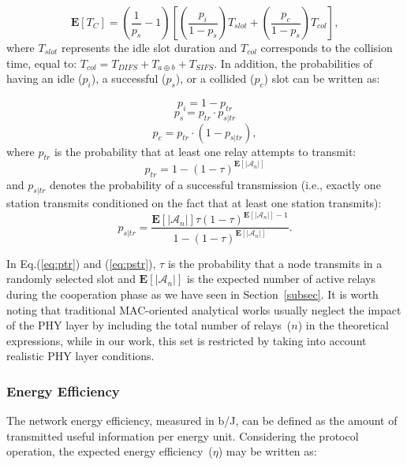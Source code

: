 \documentclass[12pt,draftcls, onecolumn]{IEEEtran}
\begin{document}
\begin{equation}
\label{eq:Tc}
\mathbf{E}[T_{C}]=(\frac{1}{p_s}-1)[(\frac{p_i}{1-p_s})T_{slot}+(\frac{p_c}{1-p_s})T_{col}],
\end{equation}
where $T_{slot}$ represents the idle slot duration and $T_{col}$ corresponds to the collision time, equal to: $T_{col}=T_{DIFS}+T_{a \oplus b}+T_{SIFS}$. In addition, the probabilities of having an idle ($p_i$), a successful ($p_s$), or a collided ($p_c$) slot can be written as:

\begin{equation}
\label{eq:pi}
 	p_i=1-p_{tr}
\end{equation}
\begin{equation}
\label{eq:ps}
 	p_s=p_{tr}\cdot p_{s|tr}
\end{equation}
\begin{equation}
\label{eq:pc}
 	p_c=p_{tr}\cdot(1-p_{s|tr}),
\end{equation}
where $p_{tr}$ is the probability that at least one relay attempts to transmit:
\begin{equation}
\label{eq:ptr}
 	p_{tr}=1-(1-\tau)^{\mathbf{E}[|\mathcal{A}_n|]}
\end{equation}
and $p_{s|tr}$ denotes the probability of a successful transmission (i.e., exactly one station transmits conditioned on the fact that at least one station transmits):
\begin{equation}
\label{eq:pstr}
 	p_{s|tr}=\frac {\mathbf{E}[|\mathcal{A}_n|]\tau (1-\tau)^{\mathbf{E}[|\mathcal{A}_n|]-1}}{1-(1-\tau)^{\mathbf{E}[|\mathcal{A}_n|]}}.
\end{equation}

In Eq.(\ref{eq:ptr}) and (\ref{eq:pstr}), $\tau$ is the probability that a node transmits in a randomly selected slot and $\mathbf{E}[|\mathcal{A}_n|]$ is the expected number of active relays during the cooperation phase as we have seen in Section~\ref{subsec}. It is worth noting that traditional MAC-oriented analytical works usually neglect the impact of the PHY layer by including the total number of relays~($n$) in the theoretical expressions, while in our work, this set is restricted by taking into account realistic PHY layer conditions.

\subsubsection{Energy Efficiency}
\label{sec:energy}

The network energy efficiency, measured in b/J, can be defined as the amount of transmitted useful information per energy unit. Considering the protocol operation, the expected energy efficiency~($\eta$) may be written as:
\end{document}
